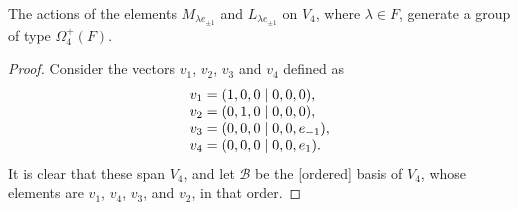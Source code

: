 \begin{lemma}
	\label{lemma:1_omega4}
	The actions of the elements $M_{\lambda e_{\pm 1}}$ and $L_{\lambda e_{\pm 1}}$
	on $V_4$, where $\lambda \in F$, generate a group of type $\Omega_4^+(F)$.
\end{lemma}

\begin{proof}
	Consider the vectors $v_1$, $v_2$, $v_3$ and $v_4$ defined as
	\begin{equation*}
		\begin{array}{r@{\;}c@{\;}l}
			v_1 & = & (1,0,0 \mid 0,0,0), \\
			v_2 & = & (0,1,0 \mid 0,0,0), \\
			v_3 & = & (0,0,0 \mid 0,0,e_{-1}), \\
			v_4 & = & (0,0,0 \mid 0,0,e_1).
		\end{array}
	\end{equation*}
	It is clear that these span $V_4$, and let $\mathcal{B}$ be 
	the [ordered] basis of $V_4$, whose
	elements are $v_1$, $v_4$, $v_3$, and $v_2$, in that order. 
	

\end{proof}
